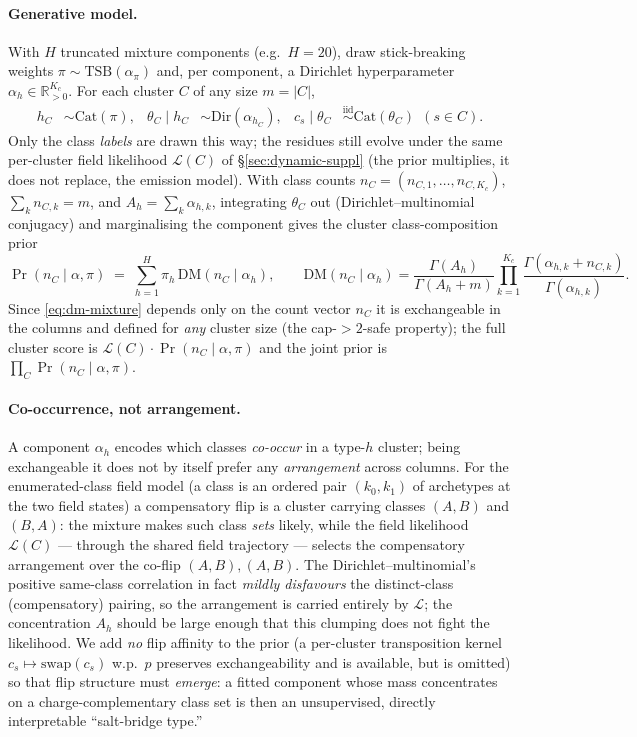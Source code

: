 \paragraph{Generative model.} With $H$ truncated mixture components (e.g.\
$H=20$), draw stick-breaking weights $\pi\sim\mathrm{TSB}(\alpha_\pi)$ and, per
component, a Dirichlet hyperparameter $\alpha_h\in\mathbb{R}_{>0}^{K_c}$. For
each cluster $C$ of any size $m=|C|$,
\begin{align}
  h_C &\sim \mathrm{Cat}(\pi), &
  \theta_C \mid h_C &\sim \mathrm{Dir}(\alpha_{h_C}), &
  c_s \mid \theta_C &\stackrel{\text{iid}}{\sim} \mathrm{Cat}(\theta_C)\ \ (s\in C).
\end{align}
Only the class \emph{labels} are drawn this way; the residues still evolve
under the same per-cluster field likelihood $\mathcal{L}(C)$ of
\S\ref{sec:dynamic-suppl} (the prior multiplies, it does not replace, the
emission model). With class counts $n_C=(n_{C,1},\dots,n_{C,K_c})$,
$\sum_k n_{C,k}=m$, and $A_h=\sum_k\alpha_{h,k}$, integrating $\theta_C$ out
(Dirichlet--multinomial conjugacy) and marginalising the component gives the
cluster class-composition prior
\begin{equation}
  \Pr(n_C\mid\alpha,\pi) \;=\; \sum_{h=1}^{H}\pi_h\,
    \mathrm{DM}(n_C\mid\alpha_h),\qquad
  \mathrm{DM}(n_C\mid\alpha_h) = \frac{\Gamma(A_h)}{\Gamma(A_h+m)}
    \prod_{k=1}^{K_c}\frac{\Gamma(\alpha_{h,k}+n_{C,k})}{\Gamma(\alpha_{h,k})}.
  \label{eq:dm-mixture}
\end{equation}
Since \eqref{eq:dm-mixture} depends only on the count vector $n_C$ it is
exchangeable in the columns and defined for \emph{any} cluster size (the
cap-$>2$-safe property); the full cluster score is
$\mathcal{L}(C)\cdot\Pr(n_C\mid\alpha,\pi)$ and the joint prior is
$\prod_C\Pr(n_C\mid\alpha,\pi)$.

\paragraph{Co-occurrence, not arrangement.} A component $\alpha_h$ encodes
which classes \emph{co-occur} in a type-$h$ cluster; being exchangeable it does
not by itself prefer any \emph{arrangement} across columns. For the
enumerated-class field model (a class is an ordered pair $(k_0,k_1)$ of
archetypes at the two field states) a compensatory flip is a cluster carrying
classes $(A,B)$ and $(B,A)$: the mixture makes such class \emph{sets} likely,
while the field likelihood $\mathcal{L}(C)$ --- through the shared field
trajectory --- selects the compensatory arrangement over the co-flip
$(A,B),(A,B)$. The Dirichlet--multinomial's positive same-class correlation in
fact \emph{mildly disfavours} the distinct-class (compensatory) pairing, so the
arrangement is carried entirely by $\mathcal{L}$; the concentration $A_h$
should be large enough that this clumping does not fight the likelihood. We add
\emph{no} flip affinity to the prior (a per-cluster transposition kernel
$c_s\mapsto\mathrm{swap}(c_s)$ w.p.\ $p$ preserves exchangeability and is
available, but is omitted) so that flip structure must \emph{emerge}: a fitted
component whose mass concentrates on a charge-complementary class set is then
an unsupervised, directly interpretable ``salt-bridge type.''


